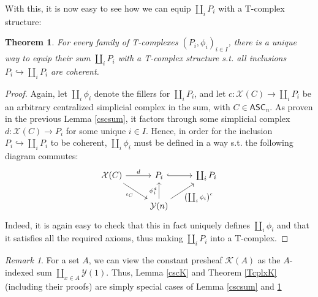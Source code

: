 \documentclass{article}
\newtheorem{theorem}{Theorem}[subsection]
\theoremstyle{remark}
\newtheorem{remark}{Remark}[subsection]
\theoremstyle{definition}
\newcommand{\ASC}{\mathsf{ASC}}
\newcommand{\Y}{\mathcal Y}
\newcommand{\X}{\mathcal X}
\newcommand{\K}{\mathcal K}
\begin{document}
	With this, it is now easy to see how we can equip $\coprod_iP_i$ with a T-complex structure:
	\begin{theorem}\label{Tcplxsum}
		For every family of T-complexes $(P_i,\phi_i)_{i\in I}$, there is a unique way to equip their sum $\coprod_iP_i$ with a T-complex structure s.t. all inclusions $P_i\hookrightarrow\coprod_iP_i$ are coherent.
	\end{theorem}
	\begin{proof}
		Again, let $\coprod_i\phi_i$ denote the fillers for $\coprod_iP_i$, and let $c:\X(C)\to\coprod_iP_i$ be an arbitrary centralized simplicial complex in the sum, with $C\in\ASC_n$. As proven in the previous Lemma \ref{cscsum}, it factors through some simplicial complex $d:\X(C)\to P_i$ for some unique $i\in I$. Hence, in order for the inclusion $P_i\hookrightarrow\coprod_iP_i$ to be coherent, $\coprod_i\phi_i$ must be defined in a way s.t. the following diagram commutes:
		\[\begin{tikzcd}
			\X(C)\arrow{r}{d}\arrow{dr}[swap]{\iota_C}&P_i\arrow[hook]{r}&\coprod_iP_i\\
			&\Y(n)\arrow{u}{\phi_i^d}\arrow{ur}[swap]{\left(\coprod_i\phi_i\right)^c}
		\end{tikzcd}\]
		Indeed, it is again easy to check that this in fact uniquely defines $\coprod_i\phi_i$ and that it satisfies all the required axioms, thus making $\coprod_iP_i$ into a T-complex.
	\end{proof}
	\begin{remark}
		For a set $A$, we can view the constant presheaf $\K(A)$ as the $A$-indexed sum $\coprod_{x\in A}\Y(1)$. Thus, Lemma \ref{cscK} and Theorem \ref{TcplxK} (including their proofs) are simply special cases of Lemma \ref{cscsum} and \ref{Tcplxsum}
	\end{remark}
\end{document}
